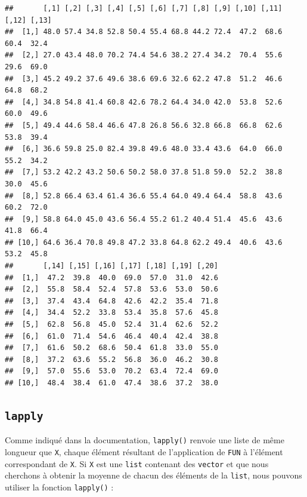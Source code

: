 \documentclass[
]{book}
\begin{document}
\begin{verbatim}
##       [,1] [,2] [,3] [,4] [,5] [,6] [,7] [,8] [,9] [,10] [,11] [,12] [,13]
##  [1,] 48.0 57.4 34.8 52.8 50.4 55.4 68.8 44.2 72.4  47.2  68.6  60.4  32.4
##  [2,] 27.0 43.4 48.0 70.2 74.4 54.6 38.2 27.4 34.2  70.4  55.6  29.6  69.0
##  [3,] 45.2 49.2 37.6 49.6 38.6 69.6 32.6 62.2 47.8  51.2  46.6  64.8  68.2
##  [4,] 34.8 54.8 41.4 60.8 42.6 78.2 64.4 34.0 42.0  53.8  52.6  60.0  49.6
##  [5,] 49.4 44.6 58.4 46.6 47.8 26.8 56.6 32.8 66.8  66.8  62.6  53.8  39.4
##  [6,] 36.6 59.8 25.0 82.4 39.8 49.6 48.0 33.4 43.6  64.0  66.0  55.2  34.2
##  [7,] 53.2 42.2 43.2 50.6 50.2 58.0 37.8 51.8 59.0  52.2  38.8  30.0  45.6
##  [8,] 52.8 66.4 63.4 61.4 36.6 55.4 64.0 49.4 64.4  58.8  43.6  60.2  72.0
##  [9,] 58.8 64.0 45.0 43.6 56.4 55.2 61.2 40.4 51.4  45.6  43.6  41.8  66.4
## [10,] 64.6 36.4 70.8 49.8 47.2 33.8 64.8 62.2 49.4  40.6  43.6  53.2  45.8
##       [,14] [,15] [,16] [,17] [,18] [,19] [,20]
##  [1,]  47.2  39.8  40.0  69.0  57.0  31.0  42.6
##  [2,]  55.8  58.4  52.4  57.8  53.6  53.0  50.6
##  [3,]  37.4  43.4  64.8  42.6  42.2  35.4  71.8
##  [4,]  34.4  52.2  33.8  53.4  35.8  57.6  45.8
##  [5,]  62.8  56.8  45.0  52.4  31.4  62.6  52.2
##  [6,]  61.0  71.4  54.6  46.4  40.4  42.4  38.8
##  [7,]  61.6  50.2  68.6  50.4  61.8  33.0  55.0
##  [8,]  37.2  63.6  55.2  56.8  36.0  46.2  30.8
##  [9,]  57.0  55.6  53.0  70.2  63.4  72.4  69.0
## [10,]  48.4  38.4  61.0  47.4  38.6  37.2  38.0
\end{verbatim}

\hypertarget{l17sapply}{%
\subsection{\texorpdfstring{\texttt{lapply}}{lapply}}\label{l17sapply}}

Comme indiqué dans la documentation, \texttt{lapply()} renvoie une liste de même longueur que \texttt{X}, chaque élément résultant de l'application de \texttt{FUN} à l'élément correspondant de \texttt{X}. Si \texttt{X} est une \texttt{list} contenant des \texttt{vector} et que nous cherchons à obtenir la moyenne de chacun des éléments de la \texttt{list}, nous pouvons utiliser la fonction \texttt{lapply()} :
\end{document}

